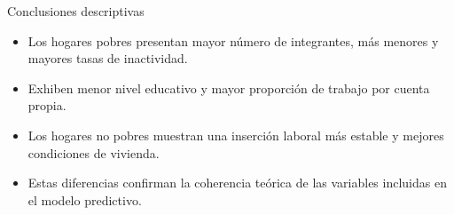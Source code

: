 \documentclass[10pt]{beamer}
\begin{document}
\begin{frame}{Conclusiones descriptivas}
\small
\begin{itemize}
    \item Los hogares pobres presentan mayor número de integrantes, más menores y mayores tasas de inactividad.
    \item Exhiben menor nivel educativo y mayor proporción de trabajo por cuenta propia.
    \item Los hogares no pobres muestran una inserción laboral más estable y mejores condiciones de vivienda.
    \item Estas diferencias confirman la coherencia teórica de las variables incluidas en el modelo predictivo.
\end{itemize}
\end{frame}

\end{document}
